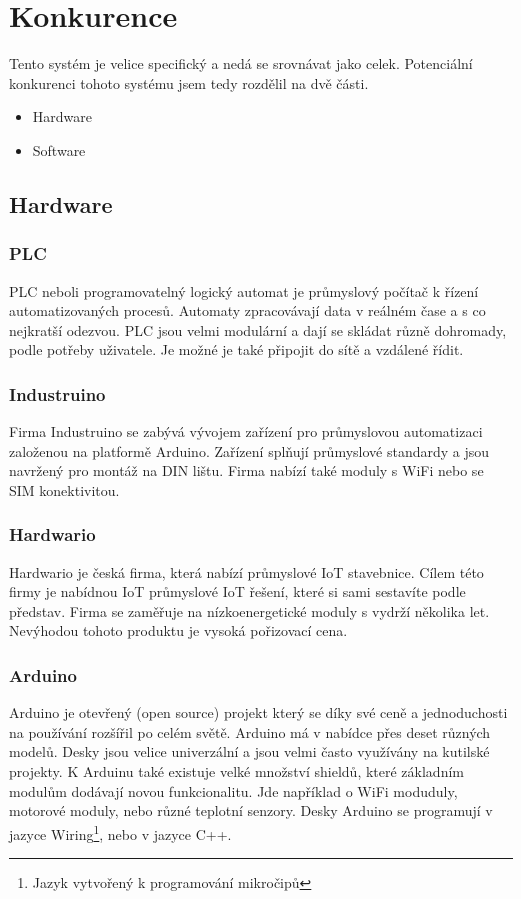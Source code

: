 \chapter{Konkurence}
Tento systém je velice specifický a nedá se srovnávat jako celek. 
Potenciální konkurenci tohoto systému jsem tedy rozdělil na dvě části.

\begin{itemize} %
    \item Hardware
    \item Software
\end{itemize}



\section{Hardware}
\fxnote[author=JA]{\textcolor{mygreen}{Přidat obrázky}}

\subsection{PLC}
PLC neboli programovatelný logický automat je průmyslový počítač k řízení automatizovaných procesů.
Automaty zpracovávají data v reálném čase a s co nejkratší odezvou.
PLC jsou velmi modulární a dají se skládat různě dohromady, podle potřeby uživatele.
Je možné je také připojit do sítě a vzdálené řídit.


\subsection{Industruino}
Firma Industruino\cite{INDUSTRINO} se zabývá vývojem zařízení pro průmyslovou automatizaci založenou na platformě Arduino.
Zařízení splňují průmyslové standardy a jsou navržený pro montáž na  DIN lištu. Firma nabízí také moduly s WiFi nebo se SIM konektivitou.


\subsection{Hardwario}
Hardwario\cite{HARDWARIO} je česká firma, která nabízí průmyslové IoT stavebnice.
Cílem této firmy je nabídnou IoT průmyslové IoT řešení, které si sami sestavíte podle představ.
Firma se zaměřuje na nízkoenergetické moduly s vydrží několika let.
Nevýhodou tohoto produktu je vysoká pořizovací cena.


\subsection{Arduino}
Arduino \cite{ARDUGREENHOUSE} je otevřený (open source) projekt který se díky své ceně a jednoduchosti na používání rozšířil po celém světě.
Arduino má v nabídce přes deset různých modelů. Desky jsou velice univerzální a jsou velmi často využívány na kutilské projekty.
K Arduinu také existuje velké množství shieldů, které základním modulům dodávají novou funkcionalitu. 
Jde například o WiFi moduduly, motorové moduly, nebo různé teplotní senzory.
Desky Arduino se programují v jazyce Wiring\footnote{Jazyk vytvořený k programování mikročipů}, nebo v jazyce C++. 




